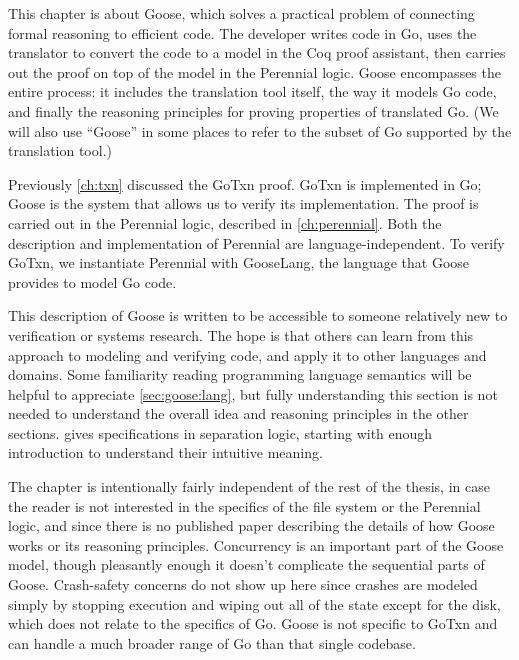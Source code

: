 This chapter is about Goose, which solves a practical
problem of connecting formal reasoning to efficient code. The developer writes
code in Go, uses the  translator to convert the code to a model in the Coq proof
assistant, then carries out the proof on top of the model in the Perennial
logic. Goose encompasses
the entire process: it includes the translation tool itself, the way it models Go
code, and finally the reasoning principles for proving properties of translated
Go. (We will also use ``Goose'' in some places to refer to the subset of Go
supported by the translation tool.)

Previously \cref{ch:txn} discussed the GoTxn proof. GoTxn is implemented in Go;
Goose is the system that allows us to verify its implementation. The proof is
carried out in the Perennial logic, described in \cref{ch:perennial}.
Both the description and implementation of Perennial are language-independent.
To verify GoTxn, we instantiate Perennial with GooseLang, the language that
Goose provides to model Go code.

This description of Goose is written to be accessible to someone relatively new
to verification or systems research. The hope is that others can learn from this
approach to modeling and verifying code, and apply it to other languages and
domains. Some familiarity reading programming language semantics will be helpful
to appreciate \cref{sec:goose:lang}, but fully understanding this section is not
needed to understand the overall idea and reasoning principles in the other
sections.  gives specifications in separation logic,
starting with enough introduction to understand their intuitive meaning.

The chapter is intentionally fairly independent of the rest of the thesis, in
case the reader is not interested in the specifics of the file system or the
Perennial logic, and since there is no published paper describing the details of
how Goose works or its reasoning principles. Concurrency is an important part of
the Goose model, though pleasantly enough it doesn't complicate the sequential
parts of Goose. Crash-safety concerns do not show up here since crashes are
modeled simply by stopping execution and wiping out all of the state except for
the disk, which does not relate to the specifics of Go. Goose is not specific to
GoTxn and can handle a much broader range of Go than that single codebase.









